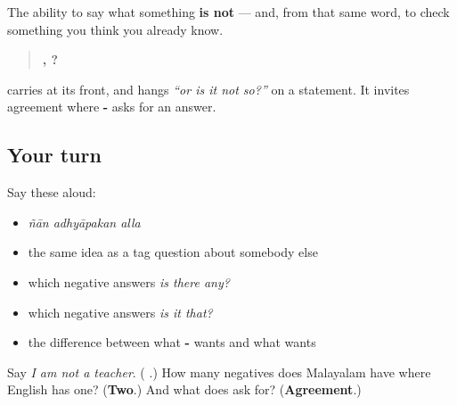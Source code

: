 \begin{grammarlens}[title={What you've built}]
The ability to say what something \textbf{is not} — and, from that same word, to check something you think you already know.

\begin{quote}
\textbf{  , ?}
\end{quote}

\textbf{} carries \textbf{} at its front, and hangs \emph{\textquotedblleft{}or is it not so?\textquotedblright{}} on a statement. It invites agreement where \textbf{-} asks for an answer.
\end{grammarlens}

\subsection*{Your turn}
Say these aloud:

\begin{itemize}
\raggedright
  \item \emph{ñān adhyāpakan alla}
  \item the same idea as a tag question about somebody else
  \item which negative answers \emph{is there any?}
  \item which negative answers \emph{is it that?}
  \item the difference between what \textbf{-} wants and what \textbf{} wants
\end{itemize}

\begin{tcolorbox}[breakable,colback=teal!4,colframe=teal!35!black,title={Before you move on}]
Say \emph{I am not a teacher}. (\emph{\textbf{  }}.) How many negatives does Malayalam have where English has one? (\textbf{Two}.) And what does \textbf{} ask for? (\textbf{Agreement}.)
\end{tcolorbox}

